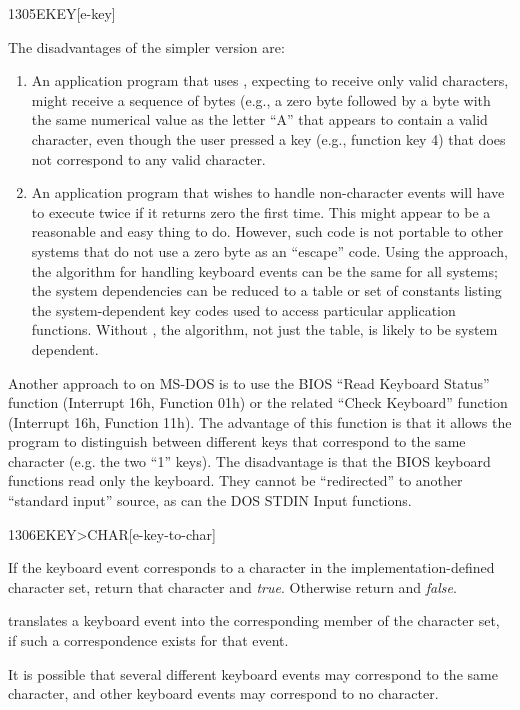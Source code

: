 \begin{worddef}{1305}{EKEY}[e-key]
\begin{rationale}
		The disadvantages of the simpler version are:

		\begin{enumerate}
		\item An application program that uses ,
			expecting to receive only valid characters, might receive a
			sequence of bytes (e.g., a zero byte followed by a byte with
			the same numerical value as the letter ``A'' that appears to
			contain a valid character, even though the user pressed a key
			(e.g., function key 4) that does not correspond to any valid
			character.

		\item An application program that wishes to handle non-character
			events will have to execute  twice if it
			returns zero the first time. This might appear to be a
			reasonable and easy thing to do. However, such code is not
			portable to other systems that do not use a zero byte as an
			``escape'' code. Using the  approach, the
			algorithm for handling keyboard events can be the same for
			all systems; the system dependencies can be reduced to a
			table or set of constants listing the system-dependent key
			codes used to access particular application functions.
			Without , the algorithm, not just the table, is
			likely to be system dependent.
		\end{enumerate}

		Another approach to  on MS-DOS is to use the BIOS
		``Read Keyboard Status'' function (Interrupt 16h, Function 01h)
		or the related ``Check Keyboard'' function (Interrupt 16h,
		Function 11h). The advantage of this function is that it allows
		the program to distinguish between different keys that correspond
		to the same character (e.g. the two ``1'' keys). The disadvantage
		is that the BIOS keyboard functions read only the keyboard. They
		cannot be ``redirected'' to another ``standard input'' source,
		as can the DOS STDIN Input functions.
	\end{rationale}
\end{worddef}


\begin{worddef}[EKEYtoCHAR]{1306}{EKEY>CHAR}[e-key-to-char]
\item {}

	If the keyboard event  corresponds to a character in the
	implementation-defined character set, return that character and
	\emph{true}. Otherwise return  and \emph{false}.

	\begin{rationale} %
		 translates a keyboard event into the
		corresponding member of the character set, if such a
		correspondence exists for that event.

		It is possible that several different keyboard events may
		correspond to the same character, and other keyboard events
		may correspond to no character.
	\end{rationale}
\end{worddef}


